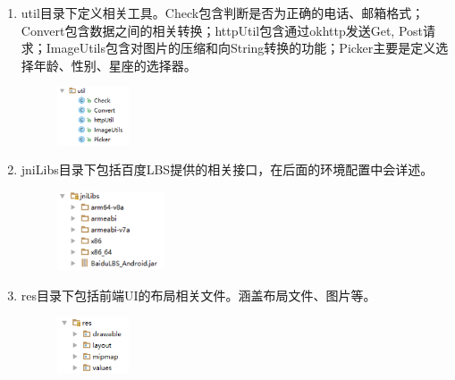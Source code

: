 \documentclass[UTF8]{article}
\begin{document}
\begin{enumerate}
    \item util目录下定义相关工具。Check包含判断是否为正确的电话、邮箱格式；Convert包含数据之间的相关转换；httpUtil包含通过okhttp发送Get, Post请求；ImageUtils包含对图片的压缩和向String转换的功能；Picker主要是定义选择年龄、性别、星座的选择器。
    \begin{figure}[H]
    \center
    \includegraphics[width=0.2\textwidth]{images/client5.png}
    \end{figure}

    \item jniLibs目录下包括百度LBS提供的相关接口，在后面的环境配置中会详述。
    \begin{figure}[H]
    \center
    \includegraphics[width=0.3\textwidth]{images/client6.png}
    \end{figure}

    \item res目录下包括前端UI的布局相关文件。涵盖布局文件、图片等。
    \begin{figure}[H]
    \center
    \includegraphics[width=0.2\textwidth]{images/client7.png}
    \end{figure}
\end{enumerate}
\end{document}
